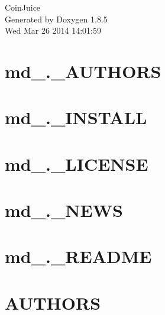 \documentclass[twoside]{book}
\newcommand{\clearemptydoublepage}{%
  \newpage{\pagestyle{empty}\cleardoublepage}%
}
\begin{document}
\hypersetup{pageanchor=false}
\begin{titlepage}
\vspace*{7cm}
\begin{center}%
{\Large Coin\-Juice }\\
\vspace*{1cm}
{\large Generated by Doxygen 1.8.5}\\
\vspace*{0.5cm}
{\small Wed Mar 26 2014 14:01:59}\\
\end{center}
\end{titlepage}
\clearemptydoublepage
\tableofcontents
\clearemptydoublepage
{}
\hypersetup{pageanchor=true}

\chapter{md\-\_\-.\-\_\-\-A\-U\-T\-H\-O\-R\-S}
\label{md__8__a_u_t_h_o_r_s}
\hypertarget{md__8__a_u_t_h_o_r_s}{}

\chapter{md\-\_\-.\-\_\-\-I\-N\-S\-T\-A\-L\-L}
\label{md__8__i_n_s_t_a_l_l}
\hypertarget{md__8__i_n_s_t_a_l_l}{}

\chapter{md\-\_\-.\-\_\-\-L\-I\-C\-E\-N\-S\-E}
\label{md__8__l_i_c_e_n_s_e}
\hypertarget{md__8__l_i_c_e_n_s_e}{}

\chapter{md\-\_\-.\-\_\-\-N\-E\-W\-S}
\label{md__8__n_e_w_s}
\hypertarget{md__8__n_e_w_s}{}

\chapter{md\-\_\-.\-\_\-\-R\-E\-A\-D\-M\-E}
\label{md__8__r_e_a_d_m_e}
\hypertarget{md__8__r_e_a_d_m_e}{}

\chapter{A\-U\-T\-H\-O\-R\-S}
\label{md__a_u_t_h_o_r_s}
\hypertarget{md__a_u_t_h_o_r_s}{}

\end{document}
